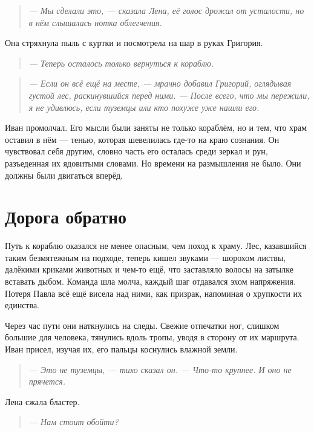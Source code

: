 \documentclass[12pt,a4paper]{book}
\newenvironment{dialogue}{\begin{quote}\itshape}{\end{quote}}
\begin{document}
\begin{dialogue}
--- Мы сделали это, --- сказала Лена, её голос дрожал от усталости, но в нём слышалась нотка облегчения.
\end{dialogue}

Она стряхнула пыль с куртки и посмотрела на шар в руках Григория.

\begin{dialogue}
--- Теперь осталось только вернуться к кораблю.
\end{dialogue}

\begin{dialogue}
--- Если он всё ещё на месте, --- мрачно добавил Григорий, оглядывая густой лес, раскинувшийся перед ними. --- После всего, что мы пережили, я не удивлюсь, если туземцы или кто похуже уже нашли его.
\end{dialogue}

Иван промолчал. Его мысли были заняты не только кораблём, но и тем, что храм оставил в нём --- тенью, которая шевелилась где-то на краю сознания. Он чувствовал себя другим, словно часть его осталась среди зеркал и рун, разъеденная их ядовитыми словами. Но времени на размышления не было. Они должны были двигаться вперёд.

\section*{Дорога обратно}

Путь к кораблю оказался не менее опасным, чем поход к храму. Лес, казавшийся таким безмятежным на подходе, теперь кишел звуками --- шорохом листвы, далёкими криками животных и чем-то ещё, что заставляло волосы на затылке вставать дыбом. Команда шла молча, каждый шаг отдавался эхом напряжения. Потеря Павла всё ещё висела над ними, как призрак, напоминая о хрупкости их единства.

Через час пути они наткнулись на следы. Свежие отпечатки ног, слишком большие для человека, тянулись вдоль тропы, уводя в сторону от их маршрута. Иван присел, изучая их, его пальцы коснулись влажной земли.

\begin{dialogue}
--- Это не туземцы, --- тихо сказал он. --- Что-то крупнее. И оно не прячется.
\end{dialogue}

Лена сжала бластер.

\begin{dialogue}
--- Нам стоит обойти?
\end{dialogue}
\end{document}
